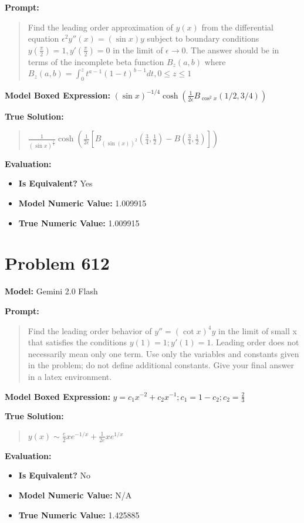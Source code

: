 \documentclass{article}
\begin{document}
\textbf{Prompt:}
\begin{quote}
Find the leading order approximation of $y(x)$ from the differential equation $\epsilon^2 y''(x)=(\sin x) y$ subject to boundary conditions $y(\frac{\pi}{2}) = 1, y'(\frac{\pi}{2}) = 0$ in the limit of $\epsilon \to 0$. The answer should be in terms of the incomplete beta function $B_z(a, b)$ where $B_z(a, b)=\int_0^z t^{a-1}(1-t)^{b-1} d t, 0 \leq z \leq 1$
\end{quote}
\textbf{Model Boxed Expression:} $(\sin x)^{-1/4} \cosh\left(\frac{1}{2\epsilon} B_{\cos^2 x}(1/2, 3/4)\right)$

\textbf{True Solution:}
\begin{quote}
$\frac{1}{(\sin x)^{\frac{1}{4}}} \cosh \left(\frac{1}{2 \epsilon}\left[B_{(\sin(x))^2}\left(\frac{3}{4}, \frac{1}{2}\right)-B\left(\frac{3}{4}, \frac{1}{2}\right)\right]\right)$
\end{quote}

\textbf{Evaluation:}
\begin{itemize}
\item \textbf{Is Equivalent?} Yes
\item \textbf{Model Numeric Value:} 1.009915
\item \textbf{True Numeric Value:} 1.009915
\end{itemize}
\vspace{1cm}
\section*{Problem 612}
\textbf{Model:} Gemini 2.0 Flash

\textbf{Prompt:}
\begin{quote}
Find the leading order behavior of $y''=(\cot x)^4 y$ in the limit of small x that satisfies the conditions $y(1) = 1; y'(1) = 1$. Leading order does not necessarily mean only one term. Use only the variables and constants given in the problem; do not define additional constants. Give your final answer in a \boxed latex environment.
\end{quote}
\textbf{Model Boxed Expression:} $y = c_1 x^{-2} + c_2 x^{-1}; c_1 = 1 - c_2; c_2 = \frac{2}{3}$

\textbf{True Solution:}
\begin{quote}
$y(x) \sim \frac{e}{2} x e^{-1/x} + \frac{1}{2e} x e^{1/x}$
\end{quote}

\textbf{Evaluation:}
\begin{itemize}
\item \textbf{Is Equivalent?} No
\item \textbf{Model Numeric Value:} N/A
\item \textbf{True Numeric Value:} 1.425885
\end{itemize}
\vspace{1cm}
\end{document}
